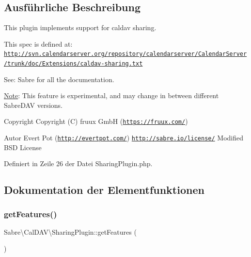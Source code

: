 \subsection{Ausführliche Beschreibung}
This plugin implements support for caldav sharing.

This spec is defined at\+: \href{http://svn.calendarserver.org/repository/calendarserver/CalendarServer/trunk/doc/Extensions/caldav-sharing.txt}{\tt http\+://svn.\+calendarserver.\+org/repository/calendarserver/\+Calendar\+Server/trunk/doc/\+Extensions/caldav-\/sharing.\+txt}

See\+: Sabre for all the documentation.

\mbox{\hyperlink{class_note}{Note}}\+: This feature is experimental, and may change in between different Sabre\+D\+AV versions.

\begin{DoxyCopyright}{Copyright}
Copyright (C) fruux GmbH (\href{https://fruux.com/}{\tt https\+://fruux.\+com/}) 
\end{DoxyCopyright}
\begin{DoxyAuthor}{Autor}
Evert Pot (\href{http://evertpot.com/}{\tt http\+://evertpot.\+com/})  \href{http://sabre.io/license/}{\tt http\+://sabre.\+io/license/} Modified B\+SD License 
\end{DoxyAuthor}


Definiert in Zeile 26 der Datei Sharing\+Plugin.\+php.



\subsection{Dokumentation der Elementfunktionen}
\mbox{\label{class_sabre_1_1_cal_d_a_v_1_1_sharing_plugin_aa6f5249f65536d78fd78a900e434821d}} 
\subsubsection{\texorpdfstring{get\+Features()}{getFeatures()}}
{\footnotesize\ttfamily Sabre\textbackslash{}\+Cal\+D\+A\+V\textbackslash{}\+Sharing\+Plugin\+::get\+Features (\begin{DoxyParamCaption}{ }\end{DoxyParamCaption})}

